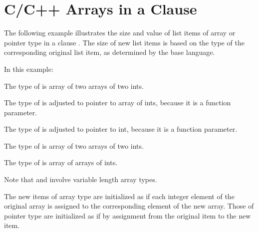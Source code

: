 \pagebreak
\chapter{C/C++ Arrays in a  Clause}
\ccppspecificstart
\label{chap:carrays_fpriv}

The following example illustrates the size and value of list items of array or 
pointer type in a  clause . The size of new list items is 
based on the type of the corresponding original list item, as determined by the 
base language.

In this example:

\begin{compactitem}
\item The type of  is array of two arrays of two ints.

\item  The type of  is adjusted to pointer to array of  
ints, because it is a function parameter.

\item  The type of  is adjusted to pointer to int, because 
it is a function parameter.

\item  The type of  is array of two arrays of two ints.

\item  The type of  is array of  arrays of  
ints.
\end{compactitem}

Note that   and  involve variable length array types.

The new items of array type are initialized as if each integer element of the original 
array is assigned to the corresponding element of the new array. Those of pointer 
type are initialized as if by assignment from the original item to the new item.

\ccppspecificend


